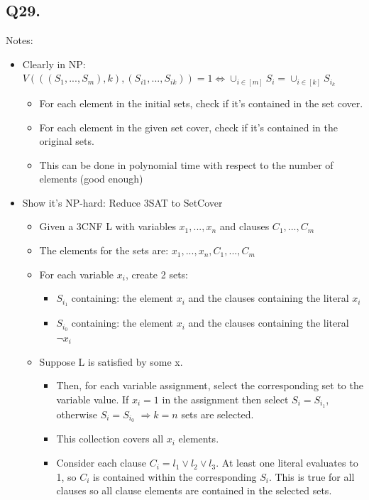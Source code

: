 \documentclass[letterpaper]{article}
\begin{document}
\subsection*{Q29.}
Notes:
\begin{itemize}
  \item Clearly in NP: $V( ((S_1,...,S_m), k ), (S_{i1},...,S_{ik})) = 1 \iff \cup_{i\in [m]} S_i = \cup_{i\in[k]} S_{i_k}$
        \begin{itemize}
          \item For each element in the initial sets, check if it's contained in the set cover.
          \item For each element in the given set cover, check if it's contained in the original sets.
          \item This can be done in polynomial time with respect to the number of elements (good enough)
        \end{itemize}
  \item Show it's NP-hard: Reduce 3SAT to SetCover
        \begin{itemize}
          \item Given a 3CNF L with variables $x_1, ...,x_n$ and clauses $C_1, ...,C_m$
          \item The elements for the sets are: $x_1,...,x_n, C_1, ..., C_m$
          \item For each variable $x_i$, create 2 sets:
                \begin{itemize}
                  \item $S_{i_1}$ containing: the element $x_i$ and the clauses containing the literal $x_i$
                  \item $S_{i_0}$ containing: the element $x_i$ and the clauses containing the literal $\neg x_i$
                \end{itemize}
          \item Suppose L is satisfied by some x.
                \begin{itemize}
                  \item Then, for each variable assignment, select the
                        corresponding set to the variable value.
                        If $x_i = 1$ in the assignment then select
                        $S_i=S_{i_1}$, otherwise $S_i=S_{i_0}$
                        $\Rightarrow k=n$  sets are selected.
                  \item This collection covers all $x_i$ elements.
                  \item Consider each clause  $C_i = l_1 \vee l_2 \vee l_3$. At least
                        one literal evaluates to 1, so $C_i$ is contained within
                        the corresponding $S_i$. This is true for all clauses
                        so all clause elements are contained in the selected sets.
                \end{itemize}


\end{itemize}
\end{itemize}
\end{document}
